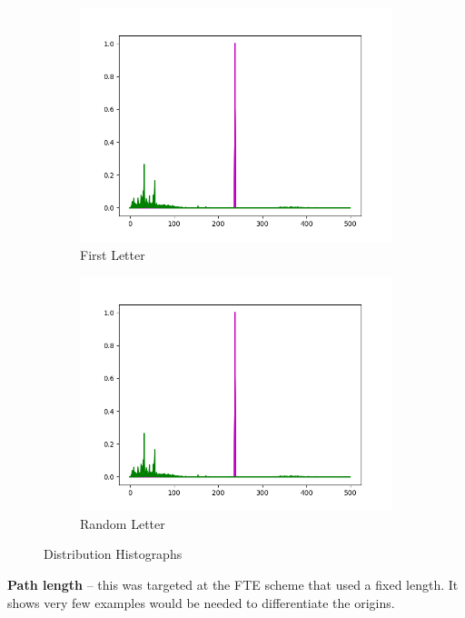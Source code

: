 \documentclass[ %
                    author={Samuel Russell},
                supervisor={Prof. Bogdan Warinschi},
                    degree={MEng},
                     title={Innocuous Ciphertexts},
                  subtitle={The DE-CENSOR Scheme},
                      type={Research},
                      year={2018} ]{dissertation}
\begin{document}
\begin{figure}[h]
\begin{subfigure}[b]{0.3\linewidth}
		\includegraphics[width=\linewidth]{bob}
		\caption{First Letter}
		\label{fig:first_hist}
	\end{subfigure}
	\begin{subfigure}[b]{0.3\linewidth}
		\includegraphics[width=\linewidth]{bob}
		\caption{Random Letter}
		\label{fig:rand_hist}
	\end{subfigure}

	\caption{Distribution Histographs}\label{fig:hists}
\end{figure}

\textbf{Path length} -- this was targeted at the FTE scheme that used a fixed length. It shows very few examples would be needed to differentiate the origins.
\end{document}
